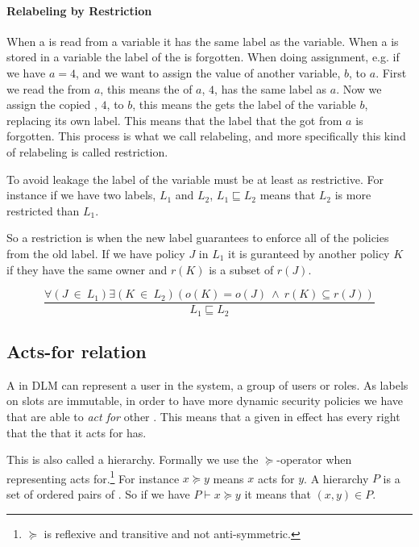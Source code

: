 \paragraph{Relabeling by Restriction}
When a \xvalue{} is read from a variable it has the same label as the variable.
When a \xvalue{} is stored in a variable the label of the \xvalue{} is forgotten.
When doing assignment, e.g. if we have $a = 4$, and we want to assign the value of another variable, $b$, to $a$.
First we read the \xvalue{} from $a$, this means the \xvalue{} of $a$, $4$, has the same label as $a$.
Now we assign the copied \xvalue{}, $4$, to $b$, this means the \xvalue{} gets the label of the variable $b$, replacing its own label.
This means that the label that the \xvalue{} got from $a$ is forgotten.
This process is what we call relabeling, and more specifically this kind of relabeling is called restriction.

To avoid leakage the label of the variable must be at least as restrictive.
For instance if we have two labels, $L_1$ and $L_2$, $L_1 \sqsubseteq L_2$ means that $L_2$ is more restricted than $L_1$.

So a restriction is when the new label guarantees to enforce all of the policies from the old label.
If we have policy $J$ in $L_1$ it is guranteed by another policy $K$ if they have the same owner and $r(K)$ is a subset of $r(J)$.
\begin{definition}
$$\frac{\forall (J \ \in \ L_1) \exists (K \ \in \ L_2)(o(K) = o(J) \ \wedge \ r(K) \subseteq r(J))}{L_1 \sqsubseteq L_2}$$
\end{definition}

\subsection{Acts-for relation}
A \principal{} in DLM can represent a user in the system, a group of users or roles.
As labels on slots are immutable, in order to have more dynamic security policies we have that \principals{} are able to \textit{act for} other \principals{}.
This means that a given \principal{} in effect has every right that the \principal{} that it acts for has.

This is also called a \principal{} hierarchy.
Formally we use the $\succeq$-operator when representing acts for.\footnote{$\succeq$ is reflexive and transitive and not anti-symmetric.}
For instance $x \succeq y$ means $x$ acts for $y$.
A \principal{} hierarchy $P$ is a set of ordered pairs of \principals{}.
So if we have $P \vdash x \succeq y$ it means that $(x,y) \in P$.

